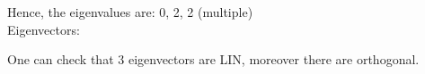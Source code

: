 \documentclass[]{article}
\begin{document}
Hence, the eigenvalues are: 0, 2, 2 (multiple)\\

Eigenvectors:

\hspace{2cm}


\hspace{2cm}


One can check that 3 eigenvectors are LIN, moreover there are
orthogonal.
\end{document}
